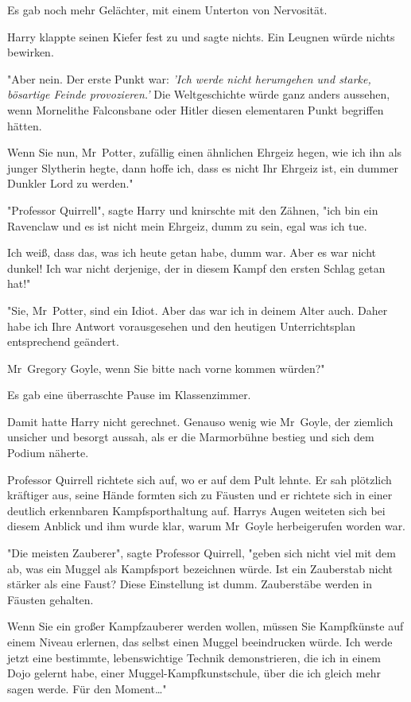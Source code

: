 {Es gab noch mehr Gelächter, mit einem Unterton von Nervosität.

Harry klappte seinen Kiefer fest zu und sagte nichts. Ein Leugnen würde nichts bewirken.

"Aber nein. Der erste Punkt war: \emph{'Ich werde nicht herumgehen und starke, bösartige Feinde provozieren.'} Die Weltgeschichte würde ganz anders aussehen, wenn Mornelithe Falconsbane oder Hitler diesen elementaren Punkt begriffen hätten.

Wenn Sie nun, Mr~Potter, zufällig einen ähnlichen Ehrgeiz hegen, wie ich ihn als junger Slytherin hegte, dann hoffe ich, dass es nicht Ihr Ehrgeiz ist, ein dummer Dunkler Lord zu werden."

"Professor Quirrell", sagte Harry und knirschte mit den Zähnen, "ich bin ein Ravenclaw und es ist nicht mein Ehrgeiz, dumm zu sein, egal was ich tue.

Ich weiß, dass das, was ich heute getan habe, dumm war. Aber es war nicht dunkel! Ich war nicht derjenige, der in diesem Kampf den ersten Schlag getan hat!"

"Sie, Mr~Potter, sind ein Idiot. Aber das war ich in deinem Alter auch. Daher habe ich Ihre Antwort vorausgesehen und den heutigen Unterrichtsplan entsprechend geändert.

Mr~Gregory Goyle, wenn Sie bitte nach vorne kommen würden?"

Es gab eine überraschte Pause im Klassenzimmer.

Damit hatte Harry nicht gerechnet. Genauso wenig wie Mr~Goyle, der ziemlich unsicher und besorgt aussah, als er die Marmorbühne bestieg und sich dem Podium näherte.

Professor Quirrell richtete sich auf, wo er auf dem Pult lehnte. Er sah plötzlich kräftiger aus, seine Hände formten sich zu Fäusten und er richtete sich in einer deutlich erkennbaren Kampfsporthaltung auf. Harrys Augen weiteten sich bei diesem Anblick und ihm wurde klar, warum Mr~Goyle herbeigerufen worden war.

"Die meisten Zauberer", sagte Professor Quirrell, "geben sich nicht viel mit dem ab, was ein Muggel als Kampfsport bezeichnen würde. Ist ein Zauberstab nicht stärker als eine Faust? Diese Einstellung ist dumm. Zauberstäbe werden in Fäusten gehalten.

Wenn Sie ein großer Kampfzauberer werden wollen, müssen Sie Kampfkünste auf einem Niveau erlernen, das selbst einen Muggel beeindrucken würde. Ich werde jetzt eine bestimmte, lebenswichtige Technik demonstrieren, die ich in einem Dojo gelernt habe, einer Muggel-Kampfkunstschule, über die ich gleich mehr sagen werde. Für den Moment…"

}
